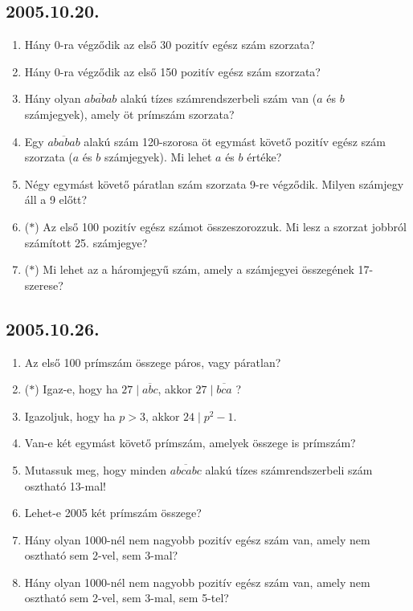 \subsection*{2005.10.20.}
\begin{enumerate}
\item Hány 0-ra végződik az első 30 pozitív egész szám szorzata?

\item Hány 0-ra végződik az első 150 pozitív egész szám szorzata?

\item Hány olyan $\overline{ababab}$ alakú tízes számrendszerbeli szám van ($a$ és $b$ számjegyek), amely öt prímszám szorzata?

\item Egy $\overline{ababab}$ alakú szám 120-szorosa öt egymást követő pozitív egész szám szorzata ($a$ és $b$ számjegyek). Mi lehet $a$ és $b$ értéke?

\item Négy egymást követő páratlan szám szorzata 9-re végződik. Milyen számjegy áll a 9 előtt?

\item ($*$) Az első 100 pozitív egész számot összeszorozzuk. Mi lesz a szorzat jobbról számított 25. számjegye?

\item ($*$) Mi lehet az a háromjegyű szám, amely a számjegyei összegének 17-szerese?
\end{enumerate}

\subsection*{2005.10.26.}
\begin{enumerate}
\item Az első 100 prímszám összege páros, vagy páratlan?

\item ($*$) Igaz-e, hogy ha $27 \mid \overline{abc}$, akkor $27 \mid \overline{bca}$ ?

\item Igazoljuk, hogy ha $p>3$, akkor $24 \mid p^2-1$. 

\item Van-e két egymást követő prímszám, amelyek összege is prímszám?

\item Mutassuk meg, hogy minden $\overline{abcabc}$ alakú tízes számrendszerbeli szám osztható 13-mal!

\item Lehet-e 2005 két prímszám összege?

\item Hány olyan 1000-nél nem nagyobb pozitív egész szám van, amely nem osztható sem 2-vel, sem 3-mal?

\item Hány olyan 1000-nél nem nagyobb pozitív egész szám van, amely nem osztható sem 2-vel, sem 3-mal, sem 5-tel?

\end{enumerate}

